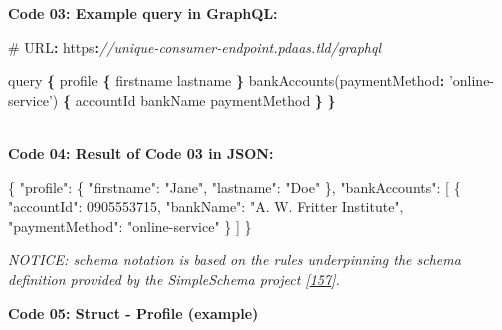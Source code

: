 \documentclass[12pt,english,a4paper,titlepage,cleardoublepage=empty,dottedtoc]{report}
\newenvironment{Shaded}{\begin{snugshade}}{\end{snugshade}}
\newcommand{\DataTypeTok}[1]{\textcolor[rgb]{0.13,0.29,0.53}{#1}}
\newcommand{\DecValTok}[1]{\textcolor[rgb]{0.00,0.00,0.81}{#1}}
\newcommand{\StringTok}[1]{\textcolor[rgb]{0.31,0.60,0.02}{#1}}
\newcommand{\CommentTok}[1]{\textcolor[rgb]{0.56,0.35,0.01}{\textit{#1}}}
\newcommand{\OtherTok}[1]{\textcolor[rgb]{0.56,0.35,0.01}{#1}}
\newcommand{\FunctionTok}[1]{\textcolor[rgb]{0.00,0.00,0.00}{#1}}
\newcommand{\OperatorTok}[1]{\textcolor[rgb]{0.81,0.36,0.00}{\textbf{#1}}}
\newcommand{\AttributeTok}[1]{\textcolor[rgb]{0.77,0.63,0.00}{#1}}
\newcommand{\NormalTok}[1]{#1}
\begin{document}
\newpage

\textbf{\protect\hypertarget{code-03_graphql-query}{}{Code 03: Example
query in GraphQL}:}

\begin{Shaded}
\begin{Highlighting}[numbers=left,,]
\NormalTok{# URL}\OperatorTok{:}\NormalTok{ https}\OperatorTok{:}\CommentTok{//unique-consumer-endpoint.pdaas.tld/graphql}

\NormalTok{query }\OperatorTok{\{}
\NormalTok{    profile }\OperatorTok{\{}
\NormalTok{        firstname}
\NormalTok{        lastname}
    \OperatorTok{\}}
    \AttributeTok{bankAccounts}\NormalTok{(}\DataTypeTok{paymentMethod}\OperatorTok{:} \StringTok{'online-service'}\NormalTok{) }\OperatorTok{\{}
\NormalTok{        accountId}
\NormalTok{        bankName}
\NormalTok{        paymentMethod}
    \OperatorTok{\}}
\OperatorTok{\}}
\end{Highlighting}
\end{Shaded}

~\\
\textbf{\protect\hypertarget{code-04_graphql-query-result}{}{Code 04:
Result of Code 03 in JSON}:}

\begin{Shaded}
\begin{Highlighting}[numbers=left,,]
\FunctionTok{\{}
    \DataTypeTok{"profile"}\FunctionTok{:} \FunctionTok{\{}
        \DataTypeTok{"firstname"}\FunctionTok{:} \StringTok{"Jane"}\FunctionTok{,} 
        \DataTypeTok{"lastname"}\FunctionTok{:} \StringTok{"Doe"}
    \FunctionTok{\},}
    \DataTypeTok{"bankAccounts"}\FunctionTok{:} \OtherTok{[}
        \FunctionTok{\{}
            \DataTypeTok{"accountId"}\FunctionTok{:} \DecValTok{0905553715}\FunctionTok{,}
            \DataTypeTok{"bankName"}\FunctionTok{:} \StringTok{"A. W. Fritter Institute"}\FunctionTok{,}
            \DataTypeTok{"paymentMethod"}\FunctionTok{:} \StringTok{"online-service"}
        \FunctionTok{\}}
    \OtherTok{]}
\FunctionTok{\}}
\end{Highlighting}
\end{Shaded}

\newpage

\emph{NOTICE: schema notation is based on the rules underpinning the
schema definition provided by the SimpleSchema project
{[}\protect\hyperlink{ref-web_2017_repo_node-simple-schema}{157}{]}.}

\textbf{\protect\hypertarget{code-05_struct_profile}{}{Code 05: Struct -
Profile (example)}}
\end{document}
